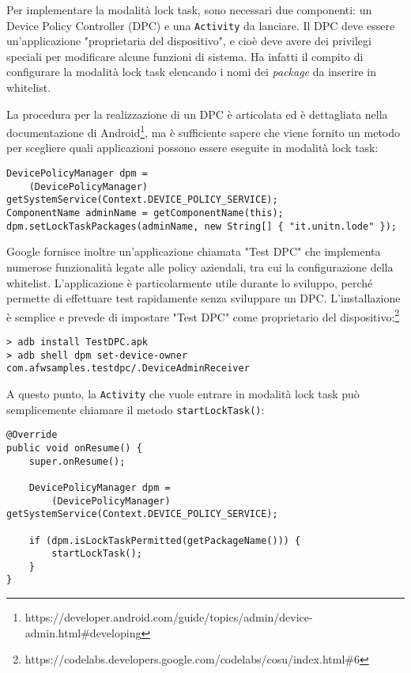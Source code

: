 Per implementare la modalità lock task, sono necessari due componenti: un Device Policy Controller (DPC) e una \texttt{Activity} da lanciare. Il DPC deve essere un'applicazione "proprietaria del dispositivo", e cioè deve avere dei privilegi speciali per modificare alcune funzioni di sistema. Ha infatti il compito di configurare la modalità lock task elencando i nomi dei \emph{package} da inserire in whitelist.

La procedura per la realizzazione di un DPC è articolata ed è dettagliata nella documentazione di Android\footnote{https://developer.android.com/guide/topics/admin/device-admin.html\#developing}, ma è sufficiente sapere che viene fornito un metodo per scegliere quali applicazioni possono essere eseguite in modalità lock task:

\begin{verbatim}
DevicePolicyManager dpm =
    (DevicePolicyManager) getSystemService(Context.DEVICE_POLICY_SERVICE);
ComponentName adminName = getComponentName(this);
dpm.setLockTaskPackages(adminName, new String[] { "it.unitn.lode" });
\end{verbatim}

Google fornisce inoltre un'applicazione chiamata "Test DPC" che implementa numerose funzionalità legate alle policy aziendali, tra cui la configurazione della whitelist. L'applicazione è particolarmente utile durante lo sviluppo, perché permette di effettuare test rapidamente senza sviluppare un DPC. L'installazione è semplice e prevede di impostare "Test DPC" come proprietario del dispositivo:\footnote{https://codelabs.developers.google.com/codelabs/cosu/index.html\#6}

\begin{verbatim}
> adb install TestDPC.apk
> adb shell dpm set-device-owner com.afwsamples.testdpc/.DeviceAdminReceiver
\end{verbatim}

A questo punto, la \texttt{Activity} che vuole entrare in modalità lock task può semplicemente chiamare il metodo \texttt{startLockTask()}:

\begin{verbatim}
@Override
public void onResume() {
    super.onResume();
    
    DevicePolicyManager dpm =
        (DevicePolicyManager) getSystemService(Context.DEVICE_POLICY_SERVICE);

    if (dpm.isLockTaskPermitted(getPackageName())) {
        startLockTask();
    }
}
\end{verbatim}

